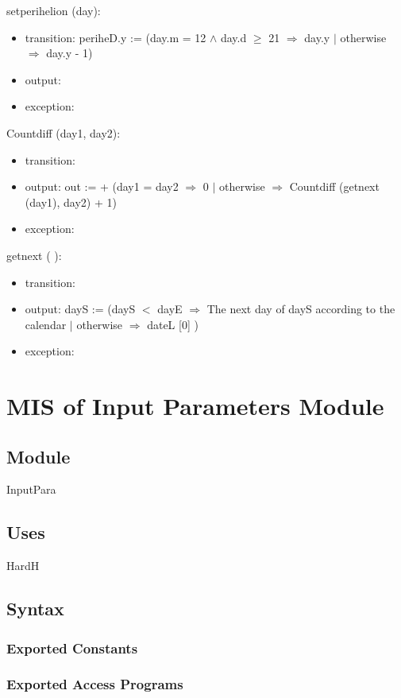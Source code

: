 \documentclass[12pt, titlepage]{article}
\begin{document}
\noindent setperihelion (day):
\begin{itemize}
\item transition: periheD.y :=  (day.m = 12 $	\wedge$ day.d $\geq	$ 21 $\Rightarrow$  day.y $|$ otherwise $\Rightarrow$  day.y - 1)
\item output: 
\item exception: 
\end{itemize}

\noindent Countdiff (day1, day2):
\begin{itemize}
\item transition:
\item output: out := + (day1 = day2 $\Rightarrow$ 0 $|$ otherwise $\Rightarrow$ Countdiff (getnext (day1), day2) + 1)
\item exception: 
\end{itemize}


\noindent  getnext (  ):
\begin{itemize}
\item transition: 
\item output: dayS := (dayS $<$ dayE $\Rightarrow$ The next day of dayS according to the calendar $|$ otherwise $\Rightarrow$ dateL [0] )
\item exception: 
\end{itemize}


\section{MIS of Input Parameters Module} \label{ModuleIP} 

\subsection{Module}
InputPara

\subsection{Uses}
HardH

\subsection{Syntax}

\subsubsection{Exported Constants}


\subsubsection{Exported Access Programs}
\end{document}
